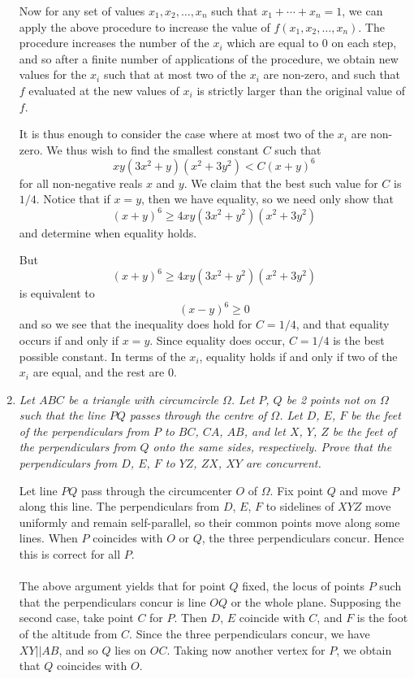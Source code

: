 \documentclass{article}
\begin{document}
\begin{enumerate}[1.]
Now for any set of values $x_1, x_2, \dots, x_n$ such that $x_1 + \cdots + x_n = 1$, we can apply the above procedure to increase the value of $f(x_1, x_2, \dots, x_n)$. The procedure increases the number of the $x_i$ which are equal to $0$ on each step, and so after a finite number of applications of the procedure, we obtain new values for the $x_i$ such that at most two of the $x_i$ are non-zero, and such that $f$ evaluated at the new values of $x_i$ is strictly larger than the original value of $f$.

It is thus enough to consider the case where at most two of the $x_i$ are non-zero. We thus wish to find the smallest constant $C$ such that
\[
	x y (3x^2 + y)(x^2 + 3y^2) < C{(x + y)}^6
\]
for all non-negative reals $x$ and $y$. We claim that the best such value for $C$ is $1/4$. Notice that if $x = y$, then we have equality, so we need only show that
\[
	{(x + y)}^6 \geq 4xy(3x^2 + y^2)(x^2 + 3y^2)
\]
and determine when equality holds.

But
\[
	{(x + y)}^6 \geq 4xy(3x^2 + y^2)(x^2 + 3y^2)
\]
is equivalent to
\[
	{(x - y)}^6 \geq 0
\]
and so we see that the inequality does hold for $C = 1/4$, and that equality occurs if and only if $x = y$. Since equality does occur, $C = 1/4$ is the best possible constant. In terms of the $x_i$, equality holds if and only if two of the $x_i$ are equal, and the rest are $0$.


\vspace{6pt}
\item 
\textit{Let $ABC$ be a triangle with circumcircle $\Omega$. Let $P$, $Q$ be 2 points not on $\Omega$ such that the line $PQ$ passes through the centre of $\Omega$. Let $D$, $E$, $F$ be the feet of the perpendiculars from $P$ to $BC$, $CA$, $AB$, and let $X$, $Y$, $Z$ be the feet of the perpendiculars from $Q$ onto the same sides, respectively. Prove that the perpendiculars from $D$, $E$, $F$ to $YZ$, $ZX$, $XY$ are concurrent.}

Let line $PQ$ pass through the circumcenter $O$ of $\Omega$. Fix point $Q$ and move $P$ along this line. The perpendiculars from $D$, $E$, $F$ to sidelines of $XYZ$ move uniformly and remain self-parallel, so their common points move along some lines. When $P$ coincides
with $O$ or $Q$, the three perpendiculars concur. Hence this is correct for all $P$.\\\\
The above argument yields that for point $Q$ fixed, the locus of points $P$ such that the perpendiculars concur is line $OQ$ or the whole plane. Supposing the second case, take point $C$ for $P$. Then $D$, $E$ coincide with $C$, and $F$ is the foot of the altitude from $C$. Since the three perpendiculars concur, we have $XY||AB$, and so $Q$ lies on $OC$. Taking now another vertex for $P$, we obtain that $Q$ coincides with $O$.

\end{enumerate}
\end{document}
